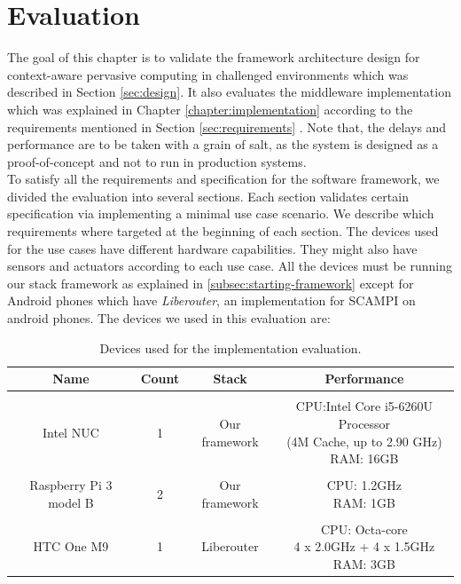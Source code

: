 
\chapter{Evaluation}\label{chapter:Evaluation}

The goal of this chapter is to validate the framework architecture design for context-aware pervasive computing in challenged environments which was described in Section \ref{sec:design}. It also evaluates the middleware implementation which was explained in Chapter \ref{chapter:implementation} according to the requirements mentioned in Section \ref{sec:requirements} . Note that, the delays and performance are to be taken with a grain of salt, as the system is designed as a proof-of-concept and not to run in production systems. \\

\noindent To satisfy all the requirements and specification for the software framework, we divided the evaluation into several sections. Each section validates certain specification via implementing a minimal use case scenario. We describe which requirements where targeted at the beginning of each section. The devices used for  the use cases have different hardware capabilities. They might also have  sensors and actuators according to each use case. All the devices must be running our stack framework as explained in \ref{subsec:starting-framework} except for Android phones which have \textit{Liberouter}, an implementation for SCAMPI on android phones. The devices we used in this evaluation are:
\begin{table}[!ht]
	\centering
	\begin{tabular}{*{4}{c}}\toprule
		Name & Count & Stack & Performance \\ \hline
		 &  &  &  \\
		Intel NUC &1& 	Our framework &   \specialcell[c]{CPU:Intel Core i5-6260U Processor\\ (4M Cache, up to 2.90 GHz)\\RAM: 16GB }\\ 
		&  &  &  \\
		Raspberry Pi 3 model B & 2 & Our framework &  \specialcell[c]{ CPU: 1.2GHz\\RAM: 1GB}  \\ 
		&  &  &  \\
		HTC One M9 & 1 & Liberouter &   \specialcell[c]{CPU: Octa-core \\4 x 2.0GHz + 4 x 1.5GHz\\ RAM: 3GB} \\ \hline

\end{tabular}
\caption{Devices used for the implementation evaluation.}
\label{table:devoces}
\end{table}

